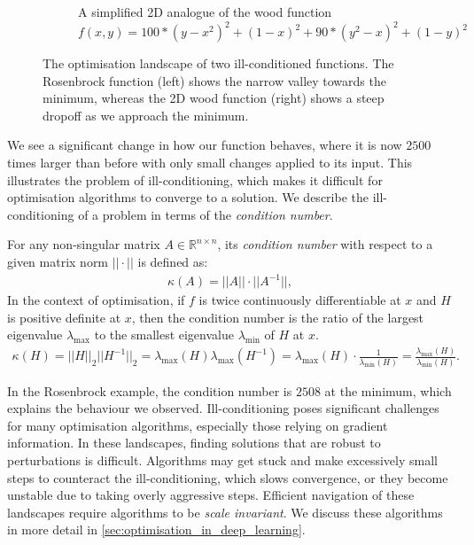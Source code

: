 \begin{figure}[h]
\begin{subfigure}[b]{0.48\linewidth}
        \caption{A simplified 2D analogue of the wood function \\
        $f(x,y) = 100*(y - x^2)^2 + (1 - x)^2 + 90*(y^2 - x)^2 + (1 - y)^2$}
        \label{fig:wood_function}
    \end{subfigure}
    \caption{The optimisation landscape of two ill-conditioned functions. The Rosenbrock function (left) shows the narrow valley towards the minimum, whereas the 2D wood function (right) shows a steep dropoff as we approach the minimum.}
    \label{fig:ill_conditioned_functions}
\end{figure}

We see a significant change in how our function behaves, where it is now $2500$ times larger than before with only small changes applied to its input. This illustrates the problem of ill-conditioning, which makes it difficult for optimisation algorithms to converge to a solution. We describe the ill-conditioning of a problem in terms of the \textit{condition number}.

\begin{definition}
    For any non-singular matrix $A \in \mathbb{R}^{n \times n}$, its \textit{condition number} with respect to a given matrix norm $||\cdot||$ is defined as:
    \begin{align}
        \kappa(A) = ||A||\cdot||A^{-1}||,
    \end{align}
    In the context of optimisation, if $f$ is twice continuously differentiable at $x$ and $H$ is positive definite at $x$, then the condition number is the ratio of the largest eigenvalue $\lambda_{\max}$ to the smallest eigenvalue $\lambda_{\min}$ of $H$ at $x$. 
    \begin{align}
        \kappa(H) = ||H||_2||H^{-1}||_2 = \lambda_{\max}(H)\lambda_{\max}(H^{-1}) = \lambda_{\max}(H) \cdot \frac{1}{\lambda_{\min}(H)} = \frac{\lambda_{\max}(H)}{\lambda_{\min}(H)}.
    \end{align}
\end{definition}

In the Rosenbrock example, the condition number is $2508$ at the minimum, which explains the behaviour we observed. Ill-conditioning poses significant challenges for many optimisation algorithms, especially those relying on gradient information. In these landscapes, finding solutions that are robust to perturbations is difficult. Algorithms may get stuck and make excessively small steps to counteract the ill-conditioning, which slows convergence, or they become unstable due to taking overly aggressive steps. Efficient navigation of these landscapes require algorithms to be \textit{scale invariant}. We discuss these algorithms in more detail in \cref{sec:optimisation_in_deep_learning}.

